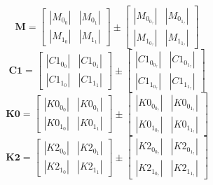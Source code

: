 \documentclass[../../report/parameterReport.tex]{subfiles}
\begin{document}
\begin{equation}
\mathbf{M}=
\left[
\begin{array}{rr}
    |M_0_0| & |M_0_1|\\
    |M_1_0| & |M_1_1|
\end{array}
\right]
\pm
\left[
\begin{array}{rr}
    |M_0_0_?| & |M_0_1_?|\\
    |M_1_0_?| & |M_1_1_?|
\end{array}
\right]
\label{eq:M}
\end{equation}
\begin{equation}
\mathbf{C1}=
\left[
\begin{array}{rr}
    |C1_0_0| & |C1_0_1|\\
    |C1_1_0| & |C1_1_1|
\end{array}
\right]
\pm
\left[
\begin{array}{rr}
    |C1_0_0_?| & |C1_0_1_?|\\
    |C1_1_0_?| & |C1_1_1_?|
\end{array}
\right]
\label{eq:C1}
\end{equation}
\begin{equation}
\mathbf{K0}=
\left[
\begin{array}{rr}
    |K0_0_0| & |K0_0_1|\\
    |K0_1_0| & |K0_1_1|
\end{array}
\right]
\pm
\left[
\begin{array}{rr}
    |K0_0_0_?| & |K0_0_1_?|\\
    |K0_1_0_?| & |K0_1_1_?|
\end{array}
\right]
\label{eq:K0}
\end{equation}
\begin{equation}
\mathbf{K2}=
\left[
\begin{array}{rr}
    |K2_0_0| & |K2_0_1|\\
    |K2_1_0| & |K2_1_1|
\end{array}
\right]
\pm
\left[
\begin{array}{rr}
    |K2_0_0_?| & |K2_0_1_?|\\
    |K2_1_0_?| & |K2_1_1_?|
\end{array}
\right]
\label{eq:K2}
\end{equation}
\end{document}
